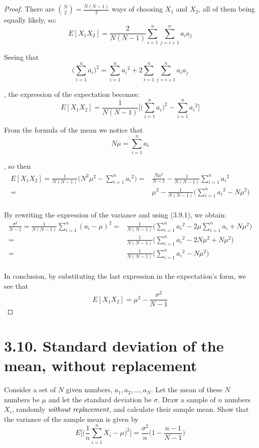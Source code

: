 \begin{proof}
    There are $\binom{N}{2} = \frac{N(N - 1)}{2}$ ways of choosing $X_1$ and $X_2$, all of
    them being equally likely, so:
    \[
        E[X_1X_2] = \frac{2}{N(N - 1)} \sum_{i = 1}^n \sum_{j = i + 1}^n a_ia_j
    \] 

    Seeing that
    \[
        \bigg(\sum_{i = 1}^n a_i\bigg)^2 = \sum_{i = 1}^n {a_i}^2 + 2\sum_{i = 1}^n \sum_{j = i + 1}^n a_ia_j
    \] 

    , the expression of the expectation becomes:
    \[
        E[X_1X_2] = \frac{1}{N(N - 1)} \bigg[\bigg(\sum_{i = 1}^n a_i\bigg)^2 - \sum_{i = 1}^n {a_i}^2\bigg]
    \] 
    
    From the formula of the mean we notice that
    \begin{equation*}\tag{3.9.1}
        N\mu = \sum_{i = 1}^n a_i
    \end{equation*}

    , so then
    \begin{align*}
        E[X_1X_2] = \frac{1}{N(N - 1)} \bigg(N^2\mu^2 - \sum_{i = 1}^n {a_i}^2\bigg) 
        =& \frac{N\mu^2}{N - 1} - \frac{1}{N(N - 1)}\sum_{i = 1}^n {a_i}^2 \\
        =& \mu^2 - \frac{1}{N(N - 1)}\bigg(\sum_{i = 1}^n {a_i}^2 - N\mu^2\bigg) \\
    \end{align*}

    By rewriting the expression of the variance and using (3.9.1), we obtain:
    \begin{align*}
        \frac{\sigma^2}{N - 1} = \frac{1}{N(N - 1)}\sum_{i = 1}^n (a_i - \mu)^2
        =& \frac{1}{N(N - 1)} \bigg(\sum_{i = 1}^n {a_i}^2 - 2\mu \sum_{i = 1}^n a_i + N\mu^2\bigg) \\
        =& \frac{1}{N(N - 1)} \bigg(\sum_{i = 1}^n {a_i}^2 - 2N\mu^2 + N\mu^2\bigg) \\
        =& \frac{1}{N(N - 1)} \bigg(\sum_{i = 1}^n {a_i}^2 - N\mu^2\bigg) \\
    \end{align*}

    In conclusion, by substituting the last expression in the expectation's form, we see
    that
    \begin{equation*}\tag{3.90}
        E[X_1X_2] = \mu^2 - \frac{\sigma^2}{N - 1}
    \end{equation*}
\end{proof}

\section*{3.10. Standard deviation of the mean, without replacement}
Consider a set of $N$ given numbers, $a_1, a_2, \ldots, a_N$. Let the mean of these
$N$ numbers be $\mu$ and let the standard deviation be $\sigma$. Draw a sample
of $n$ numbers $X_i$, randomly $\emph{without replacement}$, and calculate 
their sample mean. Show that the variance of the sample mean is given by
\begin{equation*}\tag{3.91}
    E\bigg[\bigg(\frac{1}{n}\sum_{i = 1}^n X_i - \mu\bigg)^2\bigg] 
    = \frac{\sigma^2}{n}\bigg(1 - \frac{n-1}{N-1}\bigg)
\end{equation*}


